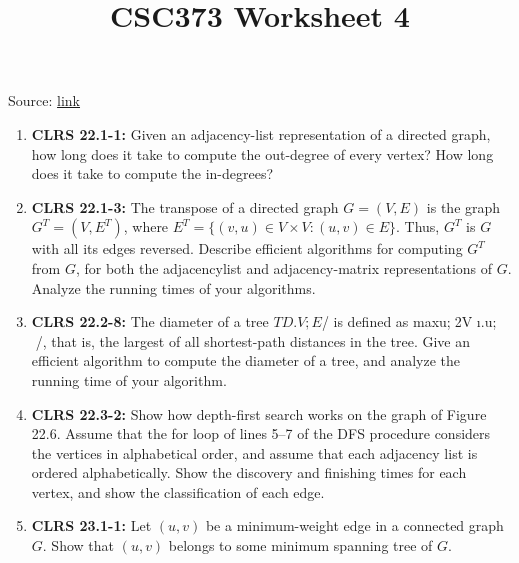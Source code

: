 \documentclass[12pt]{article}
\begin{document}
\title{CSC373 Worksheet 4}
\maketitle

\bigskip

Source: \href{http://www.cs.toronto.edu/~denisp/csc373/material.html}{link}

\bigskip

\begin{enumerate}[1.]
    \item \textbf{CLRS 22.1-1:} Given an adjacency-list representation of a directed graph, how long does it take
    to compute the out-degree of every vertex? How long does it take to compute the in-degrees?

    \item \textbf{CLRS 22.1-3:} The transpose of a directed graph $G = (V,E)$ is the graph $G^T = (V,E^T)$, where
    $E^T = \{(v,u) \in V \times V : (u,v) \in E\}$. Thus, $G^T$ is $G$ with all its edges reversed.
    Describe efficient algorithms for computing $G^T$ from $G$, for both the adjacencylist
    and adjacency-matrix representations of $G$. Analyze the running times of your
    algorithms.

    \item \textbf{CLRS 22.2-8:} The diameter of a tree $T D .V;E$/ is defined as maxu;2V ı.u; /, that is, the
    largest of all shortest-path distances in the tree. Give an efficient algorithm to
    compute the diameter of a tree, and analyze the running time of your algorithm.

    \item \textbf{CLRS 22.3-2:} Show how depth-first search works on the graph of Figure 22.6. Assume that the
    for loop of lines 5–7 of the DFS procedure considers the vertices in alphabetical
    order, and assume that each adjacency list is ordered alphabetically. Show the
    discovery and finishing times for each vertex, and show the classification of each
    edge.

    \item \textbf{CLRS 23.1-1:} Let $(u,v)$ be a minimum-weight edge in a connected graph $G$. Show that $(u,v)$
    belongs to some minimum spanning tree of $G$.

\end{enumerate}
\end{document}
